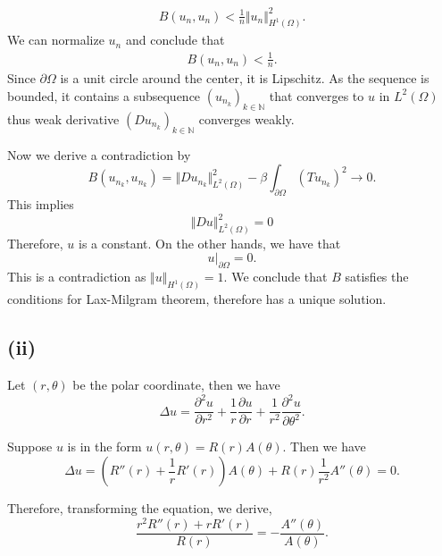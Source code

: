 \documentclass{article}
\begin{document}
\begin{align*}
B(u_n,u_n)<{\frac 1 n}\Vert u_n\Vert_{H^1(\Omega)}^2.
\end{align*}
We can normalize $u_n$ and conclude that 
\begin{align*}
B(u_n,u_n)<{\frac 1 n}.
\end{align*}
Since $\partial \Omega$ is a unit circle around the center, it is Lipschitz. As the sequence is bounded, it contains a subsequence $(u_{n_k})_{k\in\mathbb{N}}$ that converges to $u$ in $L^2(\Omega)$ thus weak derivative $(Du_{n_k})_{k\in\mathbb{N}}$ converges weakly.\\
\par Now we derive a contradiction by 
\begin{equation*}
B(u_{n_k},u_{n_k}) = \Vert Du_{n_k}\Vert^2_{L^2(\Omega)}-\beta\int_{\partial\Omega} (Tu_{n_k})^2\to 0.
\end{equation*} 
This implies
\begin{equation*}
 \Vert Du\Vert^2_{L^2(\Omega)}=0
\end{equation*}
Therefore, $u$ is a constant. On the other hands, we have that
\begin{equation*}
u|_{\partial \Omega}=0.
\end{equation*}
This is a contradiction as $\Vert u\Vert_{H^1(\Omega)}=1$. We conclude that $B$ satisfies the conditions for Lax-Milgram theorem, therefore has a unique solution.

\subsection*{(ii)}

Let $(r,\theta)$ be the polar coordinate, then we have
\begin{equation*}
\Delta u = {\frac {\partial^2 u} {\partial r^2}}+{\frac 1 r}{\frac {\partial u} {\partial r}}+{\frac 1 {r^2}}{\frac {\partial^2 u} {\partial \theta^2}}.
\end{equation*}

Suppose $u$ is in the form $u(r,\theta) = R(r)A(\theta)$. Then we have
\begin{equation*}
\Delta u = (R''(r)+{\frac 1 r}R'(r))A(\theta)+R(r){\frac 1 {r^2}}A''(\theta) = 0.
\end{equation*}

Therefore, transforming the equation, we derive,
\begin{equation*}
{\frac {r^2R''(r)+rR'(r)} {R(r)}}=-{\frac {A''(\theta)} {A(\theta)}}.
\end{equation*}
\end{document}
